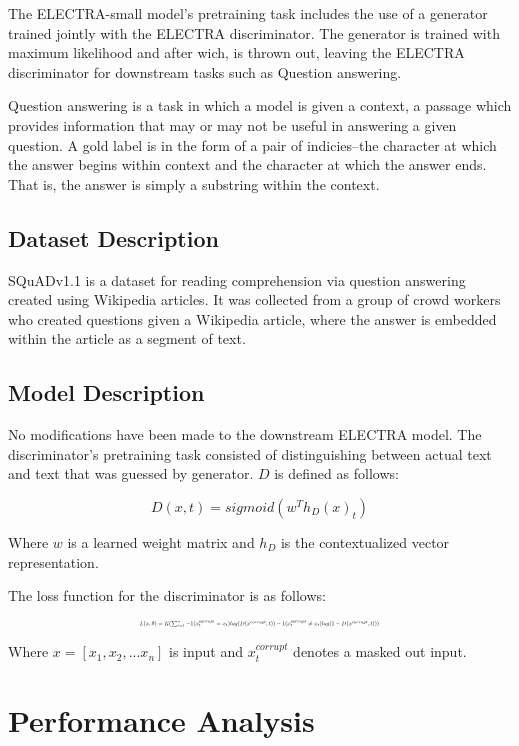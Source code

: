 \documentclass[twocolumn]{article}
\begin{document}
The ELECTRA-small model's pretraining task includes the use of a generator trained
jointly with the ELECTRA discriminator. The generator is trained with maximum likelihood
and after wich, is thrown out, leaving the ELECTRA discriminator for downstream tasks such
as Question answering.

Question answering is a task in which a model is given a context, a passage which provides
information that may or may not be useful in answering a given question. A gold label is in
the form of a pair of indicies--the character at which the answer begins within context and
the character at which the answer ends. That is, the answer is simply a substring within the
context.

\subsection{Dataset Description}

SQuADv1.1 is a dataset for reading comprehension via question answering created using Wikipedia
articles. It was collected from a group of crowd workers who created questions given a Wikipedia
article, where the answer is embedded within the article as a segment of text. 
\cite{2016arXiv160605250R}

\subsection{Model Description}

No modifications have been made to the downstream ELECTRA model. The discriminator's
pretraining task consisted of distinguishing between actual text and text that was guessed by
generator. $D$ is defined as follows:

\[
  D(x, t) = sigmoid(w^Th_D(x)_t)
\]

Where $w$ is a learned weight matrix and $h_D$ is the contextualized vector representation.

The loss function for the discriminator is as follows:

\begin{equation}
  \resizebox{0.5\textwidth}{!}{$L(x, \theta) = E(\sum_{t=1}^{n} -1(x_t^{corrupt} = x_t) log (D(x^{corrupt}, t))-1(x_t^{corrupt} \neq x_t) log(1 - D(x^{corrupt}, t)))$}
\end{equation}

Where $x = [x_1, x_2, ... x_n]$ is input and $x_t^{corrupt}$ denotes a masked out input. 
\cite{clark2020electra}

\section{Performance Analysis}
\end{document}

